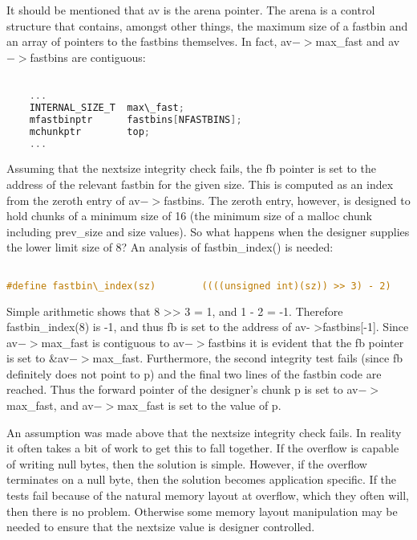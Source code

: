 \documentclass[12pt]{article}
\begin{document}
It should be mentioned that av is the arena pointer. The arena is a
control structure that contains, amongst other things, the maximum
size of a fastbin and an array of pointers to the fastbins
themselves. In fact, av$->$max\_fast and av$->$fastbins are contiguous:
\begin{lstlisting}[language=C]

    ...
    INTERNAL_SIZE_T  max\_fast;
    mfastbinptr      fastbins[NFASTBINS];
    mchunkptr        top;
    ...
\end{lstlisting}
Assuming that the nextsize integrity check fails, the fb pointer is
set to the address of the relevant fastbin for the given size. This
is computed as an index from the zeroth entry of av$->$fastbins. The
zeroth entry, however, is designed to hold chunks of a minimum size
of 16 (the minimum size of a malloc chunk including prev\_size and
size values). So what happens when the designer supplies the lower
limit size of 8? An analysis of fastbin\_index() is needed:
\begin{lstlisting}[language=C]

#define fastbin\_index(sz)        ((((unsigned int)(sz)) >> 3) - 2)
\end{lstlisting}
Simple arithmetic shows that 8 >> 3 = 1, and 1 - 2 = -1. Therefore
fastbin\_index(8) is -1, and thus fb is set to the address of av-
>fastbins[-1]. Since av$->$max\_fast is contiguous to av$->$fastbins it
is evident that the fb pointer is set to \&av$->$max\_fast.
Furthermore, the second integrity test fails (since fb definitely
does not point to p) and the final two lines of the fastbin code
are reached. Thus the forward pointer of the designer's chunk p is
set to av$->$max\_fast, and av$->$max\_fast is set to the value of p.

An assumption was made above that the nextsize integrity check
fails. In reality it often takes a bit of work to get this to fall
together. If the overflow is capable of writing null bytes, then
the solution is simple. However, if the overflow terminates on a
null byte, then the solution becomes application specific. If the
tests fail because of the natural memory layout at overflow, which
they often will, then there is no problem. Otherwise some memory
layout manipulation may be needed to ensure that the nextsize value
is designer controlled.
\end{document}
